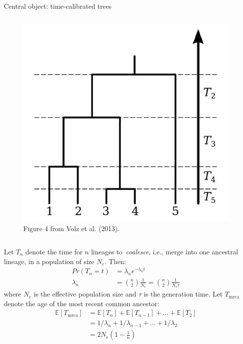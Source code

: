 \documentclass[newPxFont,numfooter,sectionpages]{beamer}
\begin{document}
\begin{frame}{Central object: time-calibrated trees}
\begin{column}{0.5\textwidth}
 \begin{figure}[!h]
\begin{center}
\includegraphics[scale=.45]{figures/coaltimes.jpg}
\caption{Figure 4 from Volz et al. (2013).}
\end{center}
\end{figure}
\end{column}
\begin{column}{0.45\textwidth}
{\tiny
 Let $T_n$ denote the time for $n$ lineages to~\textit{coalesce}, i.e., merge into one ancestral lineage, in a population of size $N_e$.
 Then:
\begin{align*}
Pr(T_n = t) &= \lambda_n e^{-\lambda_nt} \\
\lambda_n &= \binom{n}{2}\frac{1}{N_e} = \binom{n}{2}\frac{1}{N_e\tau}
\end{align*}
where $N_e$ is the effective population size and $\tau$ is the generation time.
Let $T_{\text{mrca}}$ denote the age of the most recent common ancestor:
\begin{align*}
 \mathbb{E}[T_{\text{mrca}}] &= \mathbb{E}[T_n] + \mathbb{E}[T_{n-1}] + \ldots + \mathbb{E}[T_2]\\
 &= 1/\lambda_n + 1/\lambda_{n-1} + \ldots + 1/\lambda_2\\
 &= 2N_e(1-\frac{1}{n})
\end{align*}
}
\end{column}
\end{frame}
\end{document}
